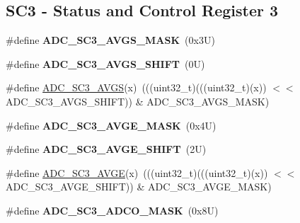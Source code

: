 \subsection*{S\+C3 -\/ Status and Control Register 3}
\begin{DoxyCompactItemize}
\item 
\mbox{\label{group___a_d_c___register___masks_ga677b69b096f22ecc80fff1a789d3c48d}} 
\#define {\bfseries A\+D\+C\+\_\+\+S\+C3\+\_\+\+A\+V\+G\+S\+\_\+\+M\+A\+SK}~(0x3\+U)
\item 
\mbox{\label{group___a_d_c___register___masks_gad00e65ae5553df8fbeef6430a61d2f74}} 
\#define {\bfseries A\+D\+C\+\_\+\+S\+C3\+\_\+\+A\+V\+G\+S\+\_\+\+S\+H\+I\+FT}~(0\+U)
\item 
\#define \mbox{\hyperlink{group___a_d_c___register___masks_gac693b130e0a9400fe61d0a23f5d59780}{A\+D\+C\+\_\+\+S\+C3\+\_\+\+A\+V\+GS}}(x)~(((uint32\+\_\+t)(((uint32\+\_\+t)(x)) $<$$<$ A\+D\+C\+\_\+\+S\+C3\+\_\+\+A\+V\+G\+S\+\_\+\+S\+H\+I\+FT)) \& A\+D\+C\+\_\+\+S\+C3\+\_\+\+A\+V\+G\+S\+\_\+\+M\+A\+SK)
\item 
\mbox{\label{group___a_d_c___register___masks_gafcb3a8cfe1a126545673ddcf733b74da}} 
\#define {\bfseries A\+D\+C\+\_\+\+S\+C3\+\_\+\+A\+V\+G\+E\+\_\+\+M\+A\+SK}~(0x4\+U)
\item 
\mbox{\label{group___a_d_c___register___masks_ga56d9621785ea853cf450f1b06d15e1d5}} 
\#define {\bfseries A\+D\+C\+\_\+\+S\+C3\+\_\+\+A\+V\+G\+E\+\_\+\+S\+H\+I\+FT}~(2\+U)
\item 
\#define \mbox{\hyperlink{group___a_d_c___register___masks_ga85f16b549c4fb29fb7e24ab525fdca12}{A\+D\+C\+\_\+\+S\+C3\+\_\+\+A\+V\+GE}}(x)~(((uint32\+\_\+t)(((uint32\+\_\+t)(x)) $<$$<$ A\+D\+C\+\_\+\+S\+C3\+\_\+\+A\+V\+G\+E\+\_\+\+S\+H\+I\+FT)) \& A\+D\+C\+\_\+\+S\+C3\+\_\+\+A\+V\+G\+E\+\_\+\+M\+A\+SK)
\item 
\mbox{\label{group___a_d_c___register___masks_ga9054cd805b818a928ca4309c717466db}} 
\#define {\bfseries A\+D\+C\+\_\+\+S\+C3\+\_\+\+A\+D\+C\+O\+\_\+\+M\+A\+SK}~(0x8\+U)
\item 
\mbox{\label{group___a_d_c___register___masks_ga8e5f5e3a1378880d2a03d1662f39c308}} 

\end{DoxyCompactItemize}
